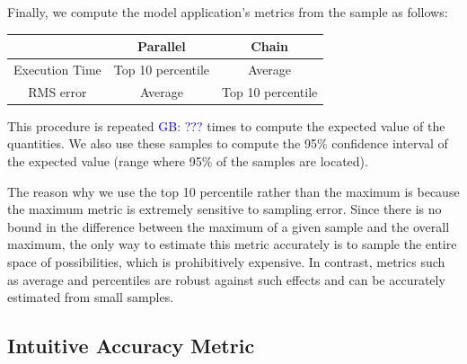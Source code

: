 \documentclass[10pt, conference, compsocconf]{IEEEtran}
\newcommand{\greg}[1]{%
  \textcolor{blue}{GB: #1}
}
\begin{document}
Finally, we compute the model application's metrics from the sample as follows:
\begin{tabular}{|c|c|c|}
\hline
               & Parallel          & Chain             \\
\hline
Execution Time & Top 10 percentile & Average           \\
\hline
RMS error      & Average           & Top 10 percentile \\
\hline
\end{tabular}
This procedure is repeated \greg{???} times to compute the expected value of the quantities.
We also use these samples to compute the 95\% confidence interval of the expected value (range where 95\% of the samples are located).

The reason why we use the top 10 percentile rather than the maximum is because the maximum metric is extremely sensitive to sampling error.
Since there is no bound in the difference between the maximum of a given sample and the overall maximum, the only way to estimate this metric accurately is to sample the entire space of possibilities, which is prohibitively expensive.
In contrast, metrics such as average and percentiles are robust against such effects and can be accurately estimated from small samples.

\vspace{-10pt}
\subsection{Intuitive Accuracy Metric}
\vspace{-10pt}
\label{sec:eval:errorsensitivity}
\end{document}
